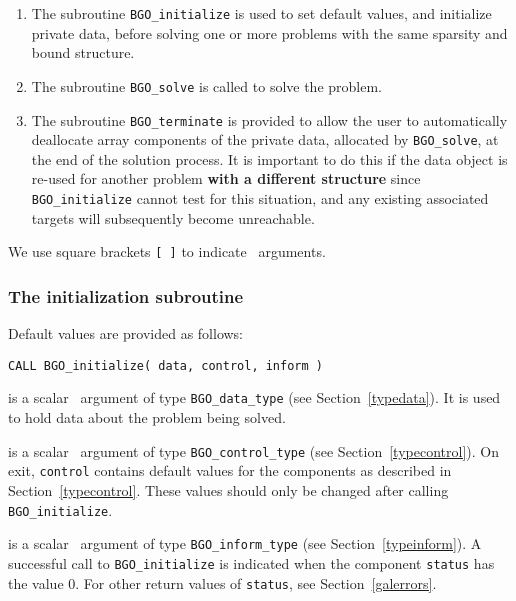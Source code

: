 \documentclass{galahad}
\newcommand{\packagename}{BGO}
\begin{document}
\begin{enumerate}
\item The subroutine
      {\tt \packagename\_initialize}
      is used to set default values, and initialize private data,
      before solving one or more problems with the
      same sparsity and bound structure.
\item The subroutine
      {\tt \packagename\_solve}
      is called to solve the problem.
\item The subroutine
      {\tt \packagename\_terminate}
      is provided to allow the user to automatically deallocate array
       components of the private data, allocated by
       {\tt \packagename\_solve},
       at the end of the solution process.
       It is important to do this if the data object is re-used for another
       problem {\bf with a different structure}
       since {\tt \packagename\_initialize} cannot test for this situation,
       and any existing associated targets will subsequently become unreachable.
\end{enumerate}
We use square brackets {\tt [ ]} to indicate \optional\ arguments.


\subsubsection{The initialization subroutine}\label{subinit}
 Default values are provided as follows:
\vspace*{1mm}

\hspace{8mm}
{\tt CALL \packagename\_initialize( data, control, inform )}

\vspace*{-2mm}
\begin{description}

 is a scalar \intentinout\ argument of type
{\tt \packagename\_data\_type}
(see Section~\ref{typedata}). It is used to hold data about the problem being
solved.

 is a scalar \intentout\ argument of type
{\tt \packagename\_control\_type}
(see Section~\ref{typecontrol}).
On exit, {\tt control} contains default values for the components as
described in Section~\ref{typecontrol}.
These values should only be changed after calling
{\tt \packagename\_initialize}.

 is a scalar \intentout\ argument of type
{\tt \packagename\_inform\_type}
(see Section~\ref{typeinform}). A successful call to
{\tt \packagename\_initialize}
is indicated when the  component {\tt status} has the value 0.
For other return values of {\tt status}, see Section~\ref{galerrors}.

\end{description}
\end{document}

